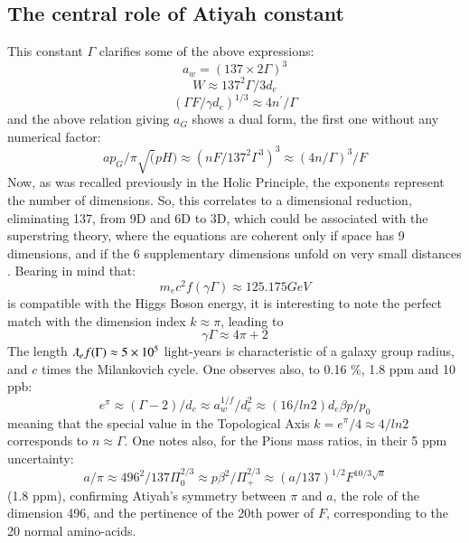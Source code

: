 \documentclass[twoside,draft]{article}
\begin{document}
\begin{sloppypar}
{\subsection {The central role of Atiyah constant}
This constant $\Gamma$ clarifies some of the above expressions:
\begin{equation}
a_{w} = (137 \times 2 \Gamma)^{3}
\end{equation}
\begin{equation}
W \approx 137^{2} \Gamma / 3d_{e}
\end{equation}
\begin{equation}
( \Gamma F/\gamma d_{e})^{1/3} \approx 4n^{\prime} / \Gamma
\end{equation}
and the above relation giving $a_{G}$ shows a dual form, the first one without any numerical factor:
\begin{equation}
ap_{G} / \pi \sqrt(pH) \approx (n F/137^{2} \Gamma^{3} )^{3} \approx (4n/ \Gamma)^{3}/F
\end{equation}
Now, as was recalled previously in the Holic Principle, the exponents represent the number of
dimensions. So, this correlates to a dimensional reduction, eliminating 137, from 9D and 6D to
3D, which could be associated with the superstring theory, where the equations are coherent only if space
has 9 dimensions, and if the 6 supplementary dimensions unfold on very small distances \cite{Polchinski}.
Bearing in mind that:
\begin{equation}
m_{e} c^{2} f(\gamma\Gamma) \approx 125.175 GeV
\end{equation}
is compatible with the Higgs Boson energy, it is interesting to note the perfect match with the dimension index $k \approx \pi$, leading to $$\gamma\Gamma \approx 4\pi + 2$$
The length $\lambdabar_{e} f(\Gamma) \approx 5\times 10^{5}$ light-years is characteristic of a galaxy group radius, and $c$ times the Milankovich cycle. One observes also, to 0.16 \%, 1.8 ppm and 10 ppb:
$$e^\pi \approx (\Gamma - 2)/d_e \approx a_w^{1/f}/d_e^2 \approx (16/ln2)d_e \beta p/p_0$$
meaning that the special value in the Topological Axis $k = e^{\pi} /4 \approx 4/ln2$ corresponds to $n \approx \Gamma$.
One notes also, for the Pions mass ratios, in their 5 ppm uncertainty:
$$a/\pi\approx 496^2/137\Pi_0^{2/3} \approx p\beta^2/\Pi_+^{2/3}\approx (a/137)^{1/2} F^{10/3\sqrt{a}}$$
(1.8 ppm), confirming Atiyah's symmetry between $\pi$ and $a$, the role of the dimension 496, and the pertinence of the 20th power of $F$, corresponding to the 20 normal amino-acids.  

}
\end{sloppypar}
\end{document}

